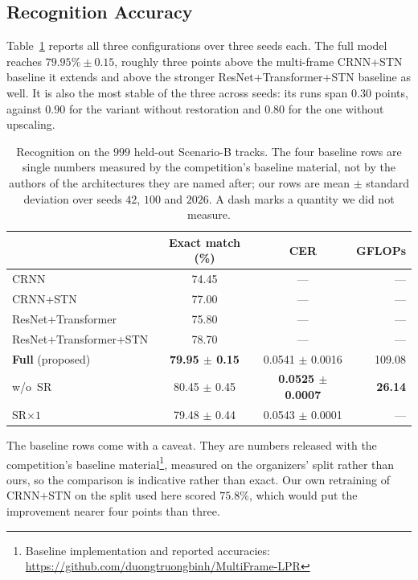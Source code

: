 \documentclass[runningheads]{llncs}
\begin{document}

\subsection{Recognition Accuracy}

Table~\ref{tab:main} reports all three configurations over three seeds each. The full model reaches $79.95\% \pm 0.15$, roughly three points above the multi-frame CRNN+STN baseline it extends and above the stronger ResNet+Transformer+STN baseline as well. It is also the most stable of the three across seeds: its runs span $0.30$ points, against $0.90$ for the variant without restoration and $0.80$ for the one without upscaling.

\begin{table}[!ht]
\centering
\caption{Recognition on the $999$ held-out Scenario-B tracks. The four baseline rows are single numbers measured by the competition's baseline material, not by the authors of the architectures they are named after; our rows are mean $\pm$ standard deviation over seeds $42$, $100$ and $2026$. A dash marks a quantity we did not measure.}
\label{tab:main}
\begin{tabular}{lccr}
\hline
 & Exact match (\%) & CER & GFLOPs \\
\hline
CRNN & 74.45 & --- & --- \\
CRNN+STN & 77.00 & --- & --- \\
ResNet+Transformer & 75.80 & --- & --- \\
ResNet+Transformer+STN & 78.70 & --- & --- \\
\hline
\textbf{Full} (proposed) & \textbf{79.95 $\pm$ 0.15} & 0.0541 $\pm$ 0.0016 & 109.08 \\
w/o~SR & 80.45 $\pm$ 0.45 & \textbf{0.0525 $\pm$ 0.0007} & \textbf{26.14} \\
SR$\times 1$ & 79.48 $\pm$ 0.44 & 0.0543 $\pm$ 0.0001 & --- \\
\hline
\end{tabular}
\end{table}

The baseline rows come with a caveat. They are numbers released with the competition's baseline material\footnote{Baseline implementation and reported accuracies: \url{https://github.com/duongtruongbinh/MultiFrame-LPR}}, measured on the organizers' split rather than ours, so the comparison is indicative rather than exact. Our own retraining of CRNN+STN on the split used here scored $75.8\%$, which would put the improvement nearer four points than three.
\end{document}

